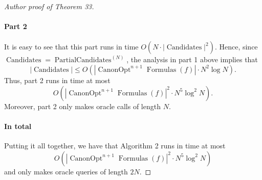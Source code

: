 \documentclass[10pt,a4paper]{article}
\newcommand{\Canon}[1]{\operatorname{CanonOpt}^{#1}\!\operatorname{Formulas}}
\newcommand{\PC}[1]{\operatorname{PartialCandidates}^{(#1)}}
\newcommand{\Candidates}{\operatorname{Candidates}}
\begin{document}
\begin{proof}[Author proof of Theorem 33]
\paragraph{Part 2}
It is easy to see that this part runs in time $O(N\cdot|\Candidates|^2)$. Hence, since $\Candidates=\PC{N}$, the analysis in part 1 above implies that
\[|\Candidates|\leq O(|\Canon{n+1}(f)|\cdot N^2\log N).\]
Thus, part 2 runs in time at most
\[O(|\Canon{n+1}(f)|^2\cdot N^5\log^2N).\]
Moreover, part 2 only makes oracle calls of length $N$.
\paragraph{In total}
Putting it all together, we have that Algorithm 2 runs in time at most
\[O(|\Canon{n+1}(f)|^2\cdot N^5\log^2N)\]
and only makes oracle queries of length $2N$.
\end{proof}
\end{document}

